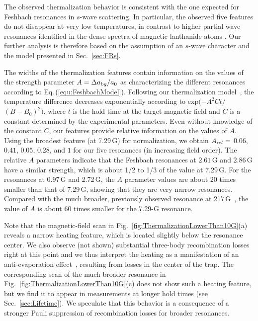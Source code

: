 The observed thermalization behavior is consistent with the one expected for Feshbach resonances in $s$-wave scattering. In particular, the observed five features do not disappear at very low temperatures, in contrast to higher partial wave resonances identified in the dense spectra of magnetic lanthanide atoms \cite{Maier2015eoc, Khlebnikov2019rtc}. Our further analysis is therefore based on the assumption of an $s$-wave character and the model presented in Sec.~\ref{sec:FRs}.

The widths of the thermalization features contain information on the values of the strength parameter {$A=\Delta a_{\textrm bg}/a_0$} as characterizing the different resonances according to Eq.\,(\ref{equ:FeshbachModel}). Following our thermalization model~\cite{Ravensbergen2020rif,Mosk2001mou}, the temperature difference decreases exponentially according to $\text{exp}(-A^2Ct/$ $(B-B_0)^2)$, where $t$ is the hold time at the target magnetic field and $C$ is a constant determined by the experimental parameters. Even without knowledge of the constant $C$, our features provide relative information on the values of $A$. Using the broadest feature (at 7.29\,G) for normalization, we obtain $A_{\textrm rel}=$ $0.06$, $0.41$, $0.05$, $0.28$, and $1$ for our five resonances (in increasing field order). The relative $A$ parameters indicate that the Feshbach resonances at $2.61$\,G and 2.86\,G have a similar strength, which is about 1/2 to 1/3 of the value at 7.29\,G. For the resonances at 0.97\,G and 2.72\,G, the $A$ parameter values are about 20 times smaller than that of 7.29\,G, showing that they are very narrow resonances. Compared with the much broader, previously observed resonance at 217\,G~\cite{Ravensbergen2020rif}, the value of $A$ is about $60$ times smaller for the 7.29-G resonance.

Note that the magnetic-field scan in Fig.~\ref{fig:ThermalizationLowerThan10G}(a) reveals a narrow heating feature, which is located slightly below the resonance center. We also observe (not shown) substantial three-body recombination losses right at this point and we thus interpret the heating as a manifestation of an anti-evaporation effect~\cite{Weber2003tbr}, resulting from losses in the center of the trap. The corresponding scan of the much broader resonance in Fig.~\ref{fig:ThermalizationLowerThan10G}(c) does not show such a heating feature, but we find it to appear in measurements at longer hold times (see Sec.~\ref{sec:Lifetime}). We speculate that this behavior is a consequence of a stronger Pauli suppression of recombination losses for broader resonances.

